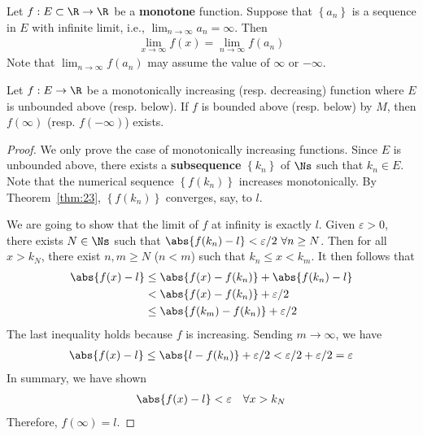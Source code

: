 \documentclass[thmcnt=section, 12pt]{elegantbook}
\begin{document}

\begin{proposition}
    Let $f: E \subset \R \to \R$ be a \textbf{monotone} function. Suppose that $\left\{a_n\right\}$ is a sequence in $E$ with infinite limit, i.e., $\lim_{n \to \infty} a_n = \infty$. Then 
    \begin{align*}
        \lim_{x \to \infty} f(x)
        = \lim_{n \to \infty} f(a_n)
    \end{align*}
    Note that $\lim_{n \to \infty} f(a_n)$ may assume the value of $\infty$ or $-\infty$.
\end{proposition}


\begin{proposition} \label{pro:2}
    Let $f: E \to \R$ be a monotonically increasing (resp. decreasing) function where $E$ is unbounded above (resp. below). If $f$ is bounded above (resp. below) by $M$, then $f(\infty)$ (resp. $f(-\infty)$) exists.
\end{proposition}

\begin{proof}
    We only prove the case of monotonically increasing functions. Since $E$ is unbounded above, there exists a \textbf{subsequence} $\left\{k_n\right\}$ of $\Ns$ such that $k_n \in E$. Note that the numerical sequence $\left\{f(k_n)\right\}$ increases monotonically. By Theorem~\ref{thm:23}, $\left\{f(k_n)\right\}$ converges, say, to $l$. 
    \par We are going to show that the limit of $f$ at infinity is exactly $l$. Given $\varepsilon > 0$, there exists $N \in \Ns$ such that $\abs{f(k_n) - l} < \varepsilon / 2 \ \forall n \geq N$. Then for all $x > k_N$, there exist $n, m \geq N$ ($n < m$) such that $k_n \leq x < k_m$. It then follows that 
    \begin{align*}
        \abs{f(x) - l}
        &\leq \abs{f(x) - f(k_n)} + \abs{f(k_n) - l} \\
        &< \abs{f(x) - f(k_n)} + \varepsilon / 2 \\
        &\leq \abs{f(k_m) - f(k_n)} + \varepsilon / 2
    \end{align*}
    The last inequality holds because $f$ is increasing. Sending $m \to \infty$, we have 
    \begin{align*}
        \abs{f(x) - l}
        \leq \abs{l - f(k_n)} + \varepsilon / 2
        < \varepsilon / 2 + \varepsilon / 2
        = \varepsilon
    \end{align*}
    In summary, we have shown
    \begin{align*}
        \abs{f(x) - l} < \varepsilon
        \quad \forall x > k_N
    \end{align*}
    Therefore, $f(\infty) = l$.
\end{proof}
\end{document}
